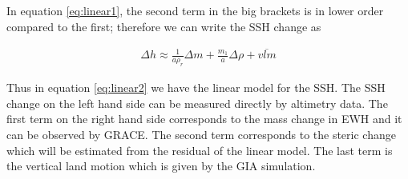 \documentclass[a4paper,12pt]{article}
\begin{document}
In equation \eqref{eq:linear1}, the second term in the big brackets is in lower order compared to the first; therefore we can write the SSH change as 

\begin{align} \label{eq:linear2}
\Delta h \approx \frac{1}{a \rho_r} \Delta m  + \frac{m_1}{a}\Delta \rho  + \overline{vlm}
\end{align}

Thus in equation \eqref{eq:linear2} we have the linear model for the SSH. The SSH change on the left hand side can be measured directly by altimetry data. The first term  on the right hand side corresponds to the mass change in EWH and it can be observed by GRACE. The second term corresponds to the steric change which will be estimated from the residual of the linear model. The last term is the vertical land motion which is given by the GIA simulation.



\end{document}
